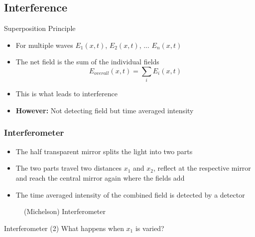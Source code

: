 \subsection{Interference}


\begin{frame}[c]{Superposition Principle}

    \begin{itemize}
        \setlength\itemsep{0.3cm}
        \item For multiple waves $E_1(x,t)$, $E_2(x,t)$, ... $E_n(x,t)$
        \item The net field is the sum of the individual fields
              \begin{equation}
                  E_{overall}(x,t) = \sum_i{ E_i(x,t) }
              \end{equation}
        \item This is what leads to interference
        \item \textbf{However:} Not detecting field but time averaged intensity

    \end{itemize}

\end{frame}



\begin{frame}
    \frametitle{Interferometer}

    \begin{itemize}
        \item<2-> The half transparent mirror splits the light into two parts
        \item<3-> The two parts travel two distances $x_1$ and $x_2$, reflect at the respective mirror and reach the central mirror again where the fields add
        \item<4-> The time averaged intensity of the combined field is detected by a detector
    \end{itemize}

    \begin{figure}
        \def\svgwidth{0.5\textwidth}
        
        \caption{(Michelson) Interferometer}
    \end{figure}

\end{frame}

\begin{frame}[t]{Interferometer (2)}
    What happens when $x_1$ is varied?

    \begin{center}
        \def\svgwidth{0.5\textwidth}
        
    \end{center}


\end{frame}


